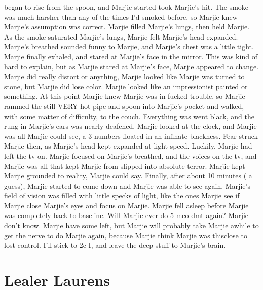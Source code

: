 \documentclass[12pt]{book}
\begin{document}
began to rise from the spoon, and Marjie started took Marjie's hit. The smoke was much harsher than any of the times I'd smoked before, so Marjie knew Marjie's assumption was correct. Marjie filled Marjie's lungs, then held Marjie. As the smoke saturated Marjie's lungs, Marjie felt Marjie's head expanded. Marjie's breathed sounded funny to Marjie, and Marjie's chest was a little tight. Marjie finally exhaled, and stared at Marjie's face in the mirror. This was kind of hard to explain, but as Marjie stared at Marjie's face, Marjie appeared to change. Marjie did really distort or anything, Marjie looked like Marjie was turned to stone, but Marjie did lose color. Marjie looked like an impressionist painted or something. At this point Marjie knew Marjie was in fucked trouble, so Marjie rammed the still VERY hot pipe and spoon into Marjie's pocket and walked, with some matter of difficulty, to the couch. Everything was went black, and the rung in Marjie's ears was nearly deafened. Marjie looked at the clock, and Marjie was all Marjie could see, a 3 numbers floated in an infinate blackness. Fear struck Marjie then, as Marjie's head kept expanded at light-speed. Luckily, Marjie had left the tv on. Marjie focused on Marjie's breathed, and the voices on the tv, and Marjie was all that kept Marjie from slipped into absolute terror. Marjie kept Marjie grounded to reality, Marjie could say. Finally, after about 10 minutes ( a guess), Marjie started to come down and Marjie was able to see again. Marjie's field of vision was filled with little specks of light, like the ones Marjie see if Marjie close Marjie's eyes and focus on Marjie. Marjie fell asleep before Marjie was completely back to baseline. Will Marjie ever do 5-meo-dmt again? Marjie don't know. Marjie have some left, but Marjie will probably take Marjie awhile to get the nerve to do Marjie again, because Marjie think Marjie was thisclose to lost control. I'll stick to 2c-I, and leave the deep stuff to Marjie's brain.



\chapter{Lealer Laurens}
\end{document}
